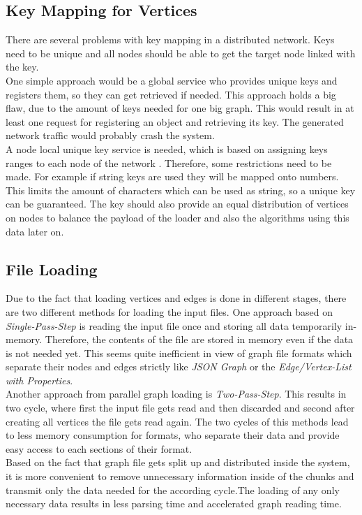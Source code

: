 \subsection{Key Mapping for Vertices}
There are several problems with key mapping in a distributed network. Keys need to be unique and all nodes should be able to get the target node linked with the key.\\
One simple approach would be a global service who provides unique keys and registers them, so they can get retrieved if needed. This approach holds a big flaw, due to the amount of keys needed for one big graph. This would result in at least one request for registering an object and retrieving its key. The generated network traffic would probably crash the system.\\
A node local unique key service is needed, which is based on assigning keys ranges to each node of the network \cite{parallelGraphLoading.10}. Therefore, some restrictions need to be made. For example if string keys are used they will be mapped onto numbers. This limits the amount of characters which can be used as string, so a unique key can be guaranteed. The key should also provide an equal distribution of vertices on nodes to balance the payload of the loader and also the algorithms using this data later on.\cite{PGX}\\

\subsection{File Loading}
Due to the fact that loading vertices and edges is done in different stages, there are two different methods for loading the input files. One approach based on \textit{Single-Pass-Step}\cite{parallelGraphLoading.10} is reading the input file once and storing all data temporarily in-memory. Therefore, the contents of the file are stored in memory even if the data is not needed yet. This seems quite inefficient in view of graph file formats which separate their nodes and edges strictly like \textit{JSON Graph} or the \textit{Edge/Vertex-List with Properties}.\\
Another approach from parallel graph loading is \textit{Two-Pass-Step}\cite{parallelGraphLoading.10}. This results in two cycle, where first the input file gets read and then discarded and second after creating all vertices the file gets read again. The two cycles of this methods lead to less memory consumption for formats, who separate their data and provide easy access to each sections of their format.\\
Based on the fact that graph file gets split up and distributed inside the system, it is more convenient to remove unnecessary information inside of the chunks and transmit only the data needed for the according cycle.The loading of any only necessary data results in less parsing time and accelerated graph reading time.\\


